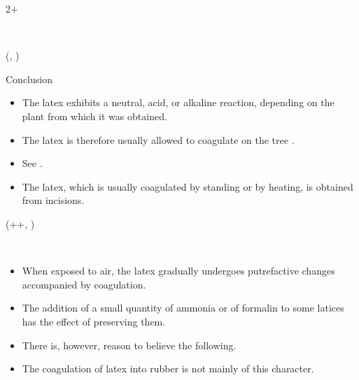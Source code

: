 \documentclass{beamer}
\newlength{\blockFour}
\begin{document}
\begin{frame}[t]
\begin{textblock*}{2\colwidth+\colsep}
\begin{block}{~}
\end{block}

\end{textblock*}




\begin{textblock*}{\colwidth}(\leftmargin, \blockFour)

\begin{block}{Conclusion}
\vspace{-0.333333\baselineskip}
\begin{itemize}
	\item The latex exhibits a neutral, acid, or alkaline reaction, depending on the plant from which it was obtained.
	\item The latex is therefore usually allowed to coagulate on the tree \citep{Koszegi2013}.
	\item See \cite{Lisi1995, Dohmen2012}.
	\item The latex, which is usually coagulated by standing or by heating, is obtained from incisions.
\end{itemize}	
\end{block}

\end{textblock*}




\begin{textblock*}{\colwidth}(\leftmargin+\colwidth+\colsep, \blockFour)

\begin{block}{~}
\vspace{-0.333333\baselineskip}
\begin{itemize}
	\item When exposed to air, the latex gradually undergoes putrefactive changes accompanied by coagulation.
	\item The addition of a small quantity of ammonia or of formalin to some latices has the effect of preserving them.
	\item There is, however, reason to believe the following.
	\item The coagulation of latex into rubber is not mainly of this character.
\end{itemize}
\end{block}

\end{textblock*}



\end{frame}
\end{document}
